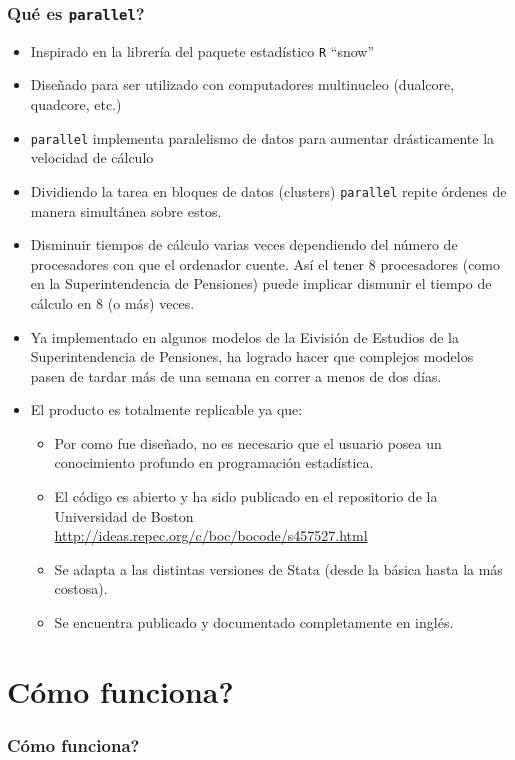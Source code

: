 \documentclass{beamer}
\begin{document}
\begin{frame}[allowframebreaks=.8]
\frametitle{Qu\'e es {\tt parallel}?}

\begin{itemize}
\item Inspirado en la librer\'ia del paquete estad\'istico {\tt R} ``snow''
\item Dise\~nado para ser utilizado con computadores multinucleo (dualcore, quadcore, etc.)
\item {\tt parallel} implementa paralelismo de datos para aumentar dr\'asticamente la velocidad de c\'alculo
\item Dividiendo la tarea en bloques de datos (clusters) {\tt parallel} repite \'ordenes de manera simult\'anea sobre estos.
\item Disminuir tiempos de c\'alculo varias veces dependiendo del n\'umero de procesadores con que el ordenador cuente. Así el tener 8 procesadores (como en la Superintendencia de Pensiones) puede implicar dismunir el tiempo de c\'alculo en 8 (o m\'as) veces.
\item Ya implementado en algunos modelos de la Eivisi\'on de Estudios de la Superintendencia de Pensiones, ha logrado hacer que complejos modelos pasen de tardar m\'as de una semana en correr a menos de dos días.
\item El producto es totalmente replicable ya que:
\begin{itemize}
\item Por como fue dise\~nado, no es necesario que el usuario posea un conocimiento profundo en programaci\'on estad\'istica.
\item El c\'odigo es abierto y ha sido publicado en el repositorio de la Universidad de Boston \url{http://ideas.repec.org/c/boc/bocode/s457527.html}
\item Se adapta a las distintas versiones de Stata (desde la b\'asica hasta la m\'as costosa).
\item Se encuentra publicado y documentado completamente en ingl\'es.
\end{itemize}
\end{itemize}

\end{frame}

\section{C\'omo funciona?}

\begin{frame}
\frametitle{C\'omo funciona?}
\begin{figure}
\centering
\scalebox{.65}{}
\end{figure}
\end{frame}
\end{document}
